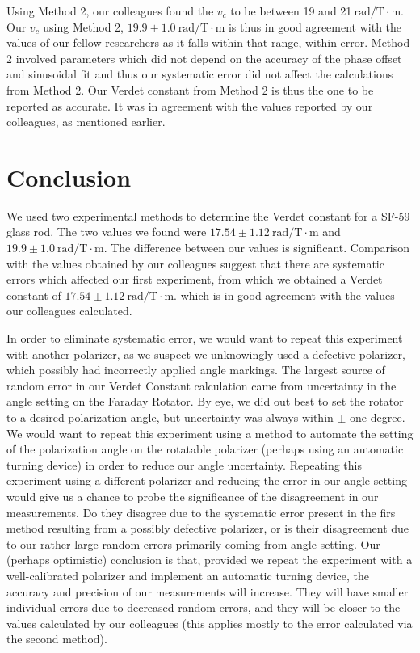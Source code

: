 \documentclass[prb,preprint]{revtex4-1}
\begin{document}
{{Using Method 2, our colleagues found the $v_c$ to be between 19 and 21$\mathrm{~rad/T} \cdot \textrm{m}$.  Our $v_c$ using Method 2, $19.9 \pm 1.0 \mathrm{~rad/T} \cdot \textrm{m}$ is thus in good agreement with the values of our fellow researchers as it falls within that range, within error. 
Method 2 involved parameters which did not depend on the accuracy of the phase offset and sinusoidal fit and thus our systematic error did not affect the calculations from Method 2.  Our Verdet constant from Method 2 is thus the one to be reported as accurate.  
It was in agreement with the values reported by our colleagues, as mentioned earlier.}

\section{Conclusion}
We used two experimental methods to determine the Verdet constant for a SF-59 glass rod. The two values we found were $17.54 \pm 1.12 \mathrm{~rad/T} \cdot \textrm{m}$ and $19.9 \pm 1.0 \mathrm{~rad/T} \cdot \textrm{m}$. The difference between our values is significant. Comparison with the values obtained by our colleagues suggest that there are systematic errors which affected our first experiment, from which we obtained a Verdet constant of $17.54 \pm 1.12 \mathrm{~rad/T} \cdot \textrm{m}$. which is in good agreement with the values our colleagues calculated.  

In order to eliminate systematic error, we would want to repeat this experiment with another polarizer, as we suspect we unknowingly used a defective polarizer, which possibly had incorrectly applied angle markings.  The largest source of random error in our Verdet Constant calculation came from uncertainty in the angle setting on the Faraday Rotator.  By eye, we did out best to set the rotator to a desired polarization angle, but uncertainty was always within $\pm$ one degree.  We would want to repeat this experiment using a method to automate the setting of the polarization angle on the rotatable polarizer (perhaps using an automatic turning device) in order to reduce our angle uncertainty.  Repeating this experiment using a different polarizer and reducing the error in our angle setting would give us a chance to probe the significance of the disagreement in our measurements.  Do they disagree due to the systematic error present in the firs method resulting from a possibly defective polarizer, or is their disagreement due to our rather large random errors primarily coming from angle setting.    Our (perhaps optimistic) conclusion is that, provided we repeat the experiment with a well-calibrated polarizer and implement an automatic turning device, the accuracy and precision of our measurements will increase.  They will have smaller individual errors due to decreased random errors, and they will be closer to the values calculated by our colleagues (this applies mostly to the error calculated via the second method).

}
\end{document}
